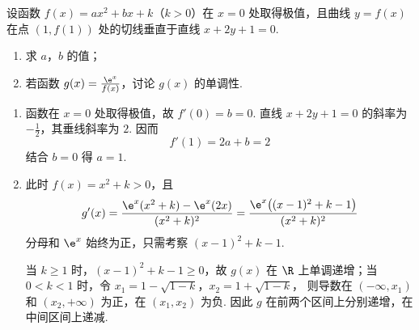 \begin{problem}
设函数 \(f(x) = ax^{2} + bx + k\)（\(k > 0\)）在 \(x = 0\) 处取得极值，且曲线 \(y = f(x)\) 在点 \((1, f(1))\) 处的切线垂直于直线 \(x + 2y + 1 = 0\).

\begin{enumerate}
\item 求 \(a\)，\(b\) 的值；
\item 若函数 \(g(x) = \frac{\e^{x}}{f(x)}\)，讨论 \(g(x)\) 的单调性.
\end{enumerate}

\begin{solution}
\begin{enumerate}
\item 函数在 \(x=0\) 处取得极值，故 \(f'(0)=b=0\). 直线 \(x+2y+1=0\) 的斜率为 \(-\frac{1}{2}\)，其垂线斜率为 \(2\). 因而
\[
f'(1)=2a+b=2
\]
结合 \(b=0\) 得 \(a=1\).
\item 此时 \(f(x)=x^2+k>0\)，且
\[
g'(x)=\frac{\e^x(x^2+k)-\e^x(2x)}{(x^2+k)^2}
=\frac{\e^x\bigl((x-1)^2+k-1\bigr)}{(x^2+k)^2}
\]
分母和 \(\e^x\) 始终为正，只需考察 \((x-1)^2+k-1\).

当 \(k\geqslant1\) 时，\((x-1)^2+k-1\geqslant0\)，故 \(g(x)\) 在 \(\R\) 上单调递增；当 \(0<k<1\) 时，令
\(x_1=1-\sqrt{1-k}\)，\(x_2=1+\sqrt{1-k}\)，
则导数在 \((-\infty,x_1)\) 和 \((x_2,+\infty)\) 为正，在 \((x_1,x_2)\) 为负. 因此 \(g\) 在前两个区间上分别递增，在中间区间上递减.
\end{enumerate}
\end{solution}
\end{problem}

